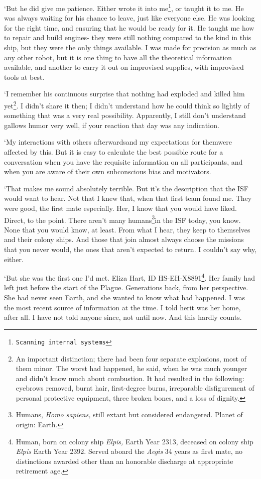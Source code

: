 `But he did give me patience. Either wrote it into
me\footnote{\texttt{Scanning internal systems\textellipsis}}, or
taught it to me. He was always waiting for his chance to leave, just
like everyone else. He was looking for the right time, and ensuring
that he would be ready for it. He taught me how to repair and build
engines- they were still nothing compared to the kind in this ship,
but they were the only things available. I was made for precision as
much as any other robot, but it is one thing to have all the
theoretical information available, and another to carry it out on
improvised supplies, with improvised tools at best.

`I remember his continuous surprise that nothing had exploded and
killed him yet\footnote{An important distinction; there had been four
separate explosions, most of them minor. The worst had happened, he
said, when he was much younger and didn't know much about
combustion. It had resulted in the following: eyebrows removed, burnt
hair, first-degree burns, irreparable disfigurement of personal
protective equipment, three broken bones, and a loss of dignity.}. I
didn't share it then; I didn't understand how he could think so
lightly of something that was a very real possibility. Apparently, I
still don't understand gallows humor very well, if your reaction that
day was any indication.

`My interactions with others afterwards\textemdash and my
expectations for them\textemdash were affected by this. But it is
easy to calculate the best possible route for a conversation when you
have the requisite information on all participants, and when you are
aware of their own subconscious bias and motivators.

`That makes me sound absolutely terrible. But it's the description
that the ISF would want to hear. Not that I knew that, when that first
team found me. They were good, the first mate especially. Her, I know
that you would have liked. Direct, to the point. There aren't many
humans\footnote{Humans, \textit{Homo sapiens,} still extant but
considered endangered. Planet of origin: Earth.}in the ISF today, you
know. None that you would know, at least. From what I hear, they keep
to themselves and their colony ships. And those that join almost
always choose the missions that you never would, the ones that aren't
expected to return. I couldn't say why, either.

`But she was the first one I'd met. Eliza Hart, ID
HS-EH-X8891\footnote{Human, born on colony ship \textit{Elpis,} Earth
Year 2313, deceased on colony ship \textit{Elpis} Earth Year
2392. Served aboard the \textit{Aegis} 34 years as first mate, no
distinctions awarded other than an honorable discharge at appropriate
retirement age.}. Her family had left just before the start of the
Plague. Generations back, from her perspective. She had never seen
Earth, and she wanted to know what had happened. I was the most recent
source of information at the time. I told her\textemdash it was her
home, after all. I have not told anyone since, not until now. And this
hardly counts.


